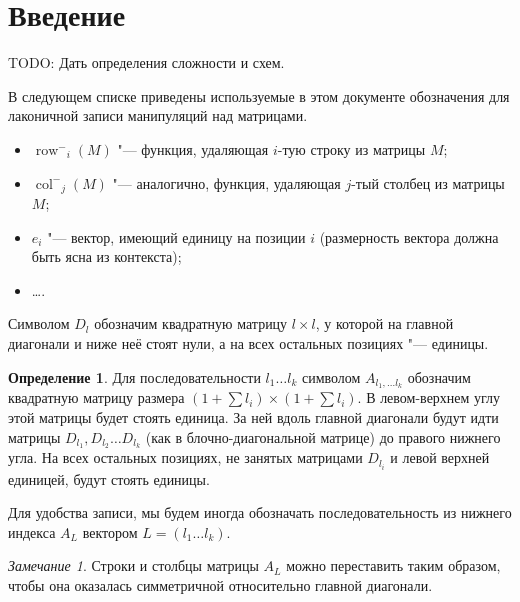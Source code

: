 \documentclass[oneside, a4paper]{article}
\theoremstyle{definition}
\newtheorem{definition}{Определение}
\theoremstyle{remark}
\newtheorem{remark}{Замечание}
\newcommand\rowm{\ensuremath{\operatorname{row}^-}}
\newcommand\colm{\ensuremath{\operatorname{col}^-}}
\begin{document}
\title{}
\author{Олейников Иван}
\date{\today}
\maketitle

\tableofcontents

\section{Введение}

TODO: Дать определения сложности и схем.

В следующем списке приведены используемые в этом документе обозначения для
лаконичной записи манипуляций над матрицами.

\begin{itemize}
\item $\rowm_i(M)$ "--- функция, удаляющая $i$-тую строку из матрицы $M$;
\item $\colm_j(M)$ "--- аналогично, функция, удаляющая $j$-тый столбец из матрицы $M$;
\item $e_i$ "--- вектор, имеющий единицу на позиции $i$ (размерность вектора
должна быть ясна из контекста);
\item \dots.
\end{itemize}

Символом $D_l$ обозначим квадратную матрицу $l \times l$, у которой на главной
диагонали и ниже неё стоят нули, а на всех остальных позициях "--- единицы.

\begin{definition}
Для последовательности $l_1 \dots l_k$ символом $A_{l_1, \dots l_k}$ обозначим
квадратную матрицу размера $(1 + \sum l_i) \times (1 + \sum l_i)$. В левом-верхнем
углу этой матрицы будет стоять единица. За ней вдоль главной диагонали будут идти
матрицы $D_{l_1}, D_{l_2} \dots D_{l_k}$ (как в блочно-диагональной матрице) до
правого нижнего угла. На всех остальных позициях, не занятых матрицами $D_{l_i}$
и левой верхней единицей, будут стоять единицы.
\end{definition}

Для удобства записи, мы будем иногда обозначать последовательность из нижнего
индекса $A_L$ вектором $L = (l_1 \dots l_k)$.

\begin{remark}
Строки и столбцы матрицы $A_L$ можно переставить таким образом, чтобы она
оказалась симметричной относительно главной диагонали.
\end{remark}
\end{document}
